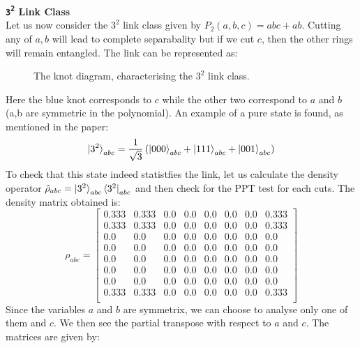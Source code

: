 \documentclass{scrartcl}
\begin{document}
            \textbf{\large \texttt{3\textsuperscript{2}} Link Class} \\[0.3cm]
Let us now consider the $3^2$ link class given by $P_2(a,b,c) = abc+ab$. Cutting any of $a,b$ will lead to complete separabality but if we cut $c$, then the other rings will remain entangled. The link can be represented as: 
\begin{figure}[H]
    \centering
    
  \caption{The knot diagram, characterising the $3^2$ link class.}
\end{figure}
\noindent
Here the blue knot corresponds to $c$ while the other two correspond to $a$ and $b$ (a,b are symmetric in the polynomial). An example of a pure state is found, as mentioned in the paper: 
$$\ket{3^2}_{abc} = \frac{1}{\sqrt{3}}\left( \ket{000}_{abc} + \ket{111}_{abc} + \ket{001}_{abc} \right) $$
To check that this state indeed statistfies the link, let us calculate the density operator $\hat{\rho}_{abc}=\ket{3^2}_{abc}\bra{3^2}_{abc}$ and then check for the PPT test for each cuts. 
The density matrix obtained is: 
\begin{equation*}
    \rho_{abc}=
    \left[
    \begin{array}{cccccccc}
    0.333 & 0.333 & 0.0 & 0.0 & 0.0 & 0.0 & 0.0 & 0.333 \\
    0.333 & 0.333 & 0.0 & 0.0 & 0.0 & 0.0 & 0.0 & 0.333 \\
    0.0 & 0.0 & 0.0 & 0.0 & 0.0 & 0.0 & 0.0 & 0.0 \\
    0.0 & 0.0 & 0.0 & 0.0 & 0.0 & 0.0 & 0.0 & 0.0 \\
    0.0 & 0.0 & 0.0 & 0.0 & 0.0 & 0.0 & 0.0 & 0.0 \\
    0.0 & 0.0 & 0.0 & 0.0 & 0.0 & 0.0 & 0.0 & 0.0 \\
    0.0 & 0.0 & 0.0 & 0.0 & 0.0 & 0.0 & 0.0 & 0.0 \\
    0.333 & 0.333 & 0.0 & 0.0 & 0.0 & 0.0 & 0.0 & 0.333 \\
    \end{array}
    \right]
    \end{equation*}
    Since the variables $a$ and $b$ are symmetrix, we can choose to analyse only one of them and $c$. We then see the partial transpose with respect to $a$ and $c$. The matrices are given by:
\end{document}
